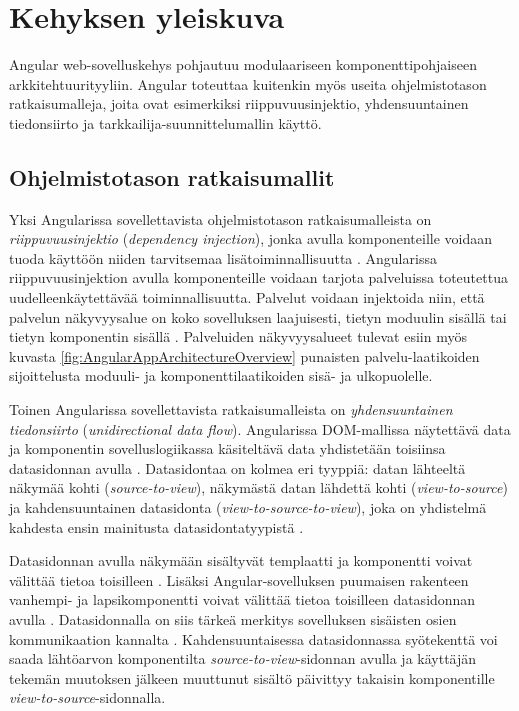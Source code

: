 \documentclass[finnish]{tktltiki2}
\theoremstyle{definition}
\theoremstyle{remark}
\numberwithin{figure}{section}
\begin{document}
\section{Kehyksen yleiskuva}

Angular web-sovelluskehys pohjautuu modulaariseen komponenttipohjaiseen arkkitehtuurityyliin. Angular toteuttaa kuitenkin myös useita ohjelmistotason ratkaisumalleja, joita ovat esimerkiksi riippuvuusinjektio, yhdensuuntainen tiedonsiirto ja tarkkailija-suunnittelumallin käyttö.

\subsection{Ohjelmistotason ratkaisumallit}

Yksi Angularissa sovellettavista ohjelmistotason ratkaisumalleista on \textit{riippuvuusinjektio} (\textit{dependency injection}), jonka avulla komponenteille voidaan tuoda käyttöön niiden tarvitsemaa lisätoiminnallisuutta \cite{DependencyInjectionPattern}. Angularissa riippuvuusinjektion avulla komponenteille voidaan tarjota palveluissa toteutettua uudelleenkäytettävää toiminnallisuutta. Palvelut voidaan injektoida niin, että palvelun näkyvyysalue on koko sovelluksen laajuisesti, tietyn moduulin sisällä tai tietyn komponentin sisällä \cite{DependencyInjection}. Palveluiden näkyvyysalueet tulevat esiin myös kuvasta \ref{fig:AngularAppArchitectureOverview} punaisten palvelu-laatikoiden sijoittelusta moduuli- ja komponenttilaatikoiden sisä- ja ulkopuolelle.

Toinen Angularissa sovellettavista ratkaisumalleista on \textit{yhdensuuntainen tiedonsiirto} (\textit{unidirectional data flow}). Angularissa DOM-mallissa näytettävä data ja komponentin sovelluslogiikassa käsiteltävä data yhdistetään toisiinsa datasidonnan avulla \cite{TemplateSyntax}. Datasidontaa on kolmea eri tyyppiä: datan lähteeltä näkymää kohti (\textit{source-to-view}), näkymästä datan lähdettä kohti (\textit{view-to-source}) ja kahdensuuntainen datasidonta (\textit{view-to-source-to-view}), joka on yhdistelmä kahdesta ensin mainitusta datasidontatyypistä \cite{TemplateSyntax}. 

Datasidonnan avulla näkymään sisältyvät templaatti ja komponentti voivat välittää tietoa toisilleen \cite{ArchitectureComponents}. Lisäksi Angular-sovelluksen puumaisen rakenteen vanhempi- ja lapsikomponentti voivat välittää tietoa toisilleen datasidonnan avulla \cite{ArchitectureComponents}. Datasidonnalla on siis tärkeä merkitys sovelluksen sisäisten osien kommunikaation kannalta \cite{ArchitectureComponents}. Kahdensuuntaisessa datasidonnassa syötekenttä voi saada lähtöarvon komponentilta \textit{source-to-view}-sidonnan avulla ja käyttäjän tekemän muutoksen jälkeen muuttunut sisältö päivittyy takaisin komponentille \textit{view-to-source}-sidonnalla. 
\end{document}

